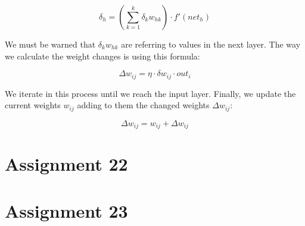 \documentclass[12pt]{article}
\begin{document}
$$ \delta_{h} = (\sum_{k=1}^{k} \delta_{k} w_{hk}) \cdot f'(net_{h}) $$

We must be warned that $\delta_{k}w_{hk}$ are referring to values in the
next layer. The way we calculate the weight changes is using this formula:

$$ \Delta w_{ij} = \eta \cdot \delta w_{ij} \cdot out_{i} $$

We iterate in this process until we reach the input layer. Finally, we update
the current weights $w_{ij}$ adding to them the changed
weights $\Delta w_{ij} $:

$$ \Delta w_{ij} = w_{ij} + \Delta w_{ij} $$

\section{Assignment 22}

\section{Assignment 23}

 
\end{document}
